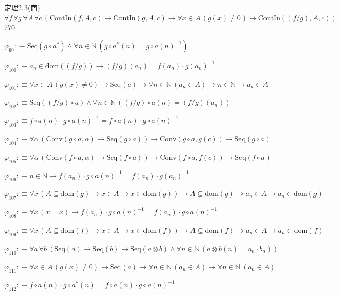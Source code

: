 \begin{fullproof}{定理2.3(商)}{$\forall f\,\forall g\,\forall A\,\forall c\,(\mathrm{ContIn}(f,A,c) \to \mathrm{ContIn}(g,A,c) \to \forall x \in A\,(g(x) \neq 0) \to \mathrm{ContIn}((f / g),A,c))$}{770}
\begin{abbrevlist}
\item $\varphi_{99} :\equiv \mathrm{Seq}(g \circ a^{\ast}) \land \forall n \in \mathbb{N}\,(g \circ a^{\ast}(n) = g \circ a(n)^{-1})$
\item $\varphi_{100} :\equiv a_{n} \in \mathrm{dom}((f / g)) \to (f / g)(a_{n}) = f(a_{n}) \cdot g(a_{n})^{-1}$
\item $\varphi_{101} :\equiv \forall x \in A\,(g(x) \neq 0) \to \mathrm{Seq}(a) \to \forall n \in \mathbb{N}\,(a_{n} \in A) \to n \in \mathbb{N} \to a_{n} \in A$
\item $\varphi_{102} :\equiv \mathrm{Seq}((f / g) \circ a) \land \forall n \in \mathbb{N}\,((f / g) \circ a(n) = (f / g)(a_{n}))$
\item $\varphi_{103} :\equiv f \circ a(n) \cdot g \circ a(n)^{-1} = f \circ a(n) \cdot g \circ a(n)^{-1}$
\item $\varphi_{104} :\equiv \forall \alpha\,(\mathrm{Conv}(g \circ a,\alpha) \to \mathrm{Seq}(g \circ a)) \to \mathrm{Conv}(g \circ a,g(c)) \to \mathrm{Seq}(g \circ a)$
\item $\varphi_{105} :\equiv \forall \alpha\,(\mathrm{Conv}(f \circ a,\alpha) \to \mathrm{Seq}(f \circ a)) \to \mathrm{Conv}(f \circ a,f(c)) \to \mathrm{Seq}(f \circ a)$
\item $\varphi_{106} :\equiv n \in \mathbb{N} \to f(a_{n}) \cdot g \circ a(n)^{-1} = f(a_{n}) \cdot g(a_{n})^{-1}$
\item $\varphi_{107} :\equiv \forall x\,(A \subseteq \mathrm{dom}(g) \to x \in A \to x \in \mathrm{dom}(g)) \to A \subseteq \mathrm{dom}(g) \to a_{n} \in A \to a_{n} \in \mathrm{dom}(g)$
\item $\varphi_{108} :\equiv \forall x\,(x = x) \to f(a_{n}) \cdot g \circ a(n)^{-1} = f(a_{n}) \cdot g \circ a(n)^{-1}$
\item $\varphi_{109} :\equiv \forall x\,(A \subseteq \mathrm{dom}(f) \to x \in A \to x \in \mathrm{dom}(f)) \to A \subseteq \mathrm{dom}(f) \to a_{n} \in A \to a_{n} \in \mathrm{dom}(f)$
\item $\varphi_{110} :\equiv \forall a\,\forall b\,(\mathrm{Seq}(a) \to \mathrm{Seq}(b) \to \mathrm{Seq}(a \otimes b) \land \forall n \in \mathbb{N}\,(a \otimes b(n) = a_{n} \cdot b_{n}))$
\item $\varphi_{111} :\equiv \forall x \in A\,(g(x) \neq 0) \to \mathrm{Seq}(a) \to \forall n \in \mathbb{N}\,(a_{n} \in A) \to \forall n \in \mathbb{N}\,(a_{n} \in A)$
\item $\varphi_{112} :\equiv f \circ a(n) \cdot g \circ a^{\ast}(n) = f \circ a(n) \cdot g \circ a(n)^{-1}$

\end{abbrevlist}
\end{fullproof}
